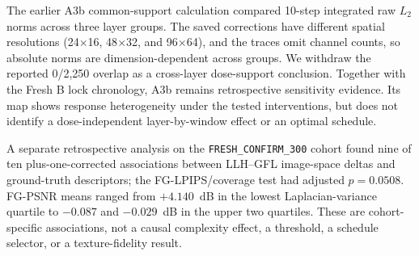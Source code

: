 \documentclass[11pt]{article}
\begin{document}
The earlier A3b common-support calculation compared 10-step integrated raw $L_2$ norms across three layer groups. The saved corrections have different spatial resolutions (24$\times$16, 48$\times$32, and 96$\times$64), and the traces omit channel counts, so absolute norms are dimension-dependent across groups. We withdraw the reported 0/2,250 overlap as a cross-layer dose-support conclusion. Together with the Fresh B lock chronology, A3b remains retrospective sensitivity evidence. Its map shows response heterogeneity under the tested interventions, but does not identify a dose-independent layer-by-window effect or an optimal schedule.

A separate retrospective analysis on the \texttt{FRESH\_CONFIRM\_300} cohort found nine of ten plus-one-corrected associations between LLH--GFL image-space deltas and ground-truth descriptors; the FG-LPIPS/coverage test had adjusted $p=0.0508$. FG-PSNR means ranged from $+4.140$~dB in the lowest Laplacian-variance quartile to $-0.087$ and $-0.029$~dB in the upper two quartiles. These are cohort-specific associations, not a causal complexity effect, a threshold, a schedule selector, or a texture-fidelity result.
\end{document}
